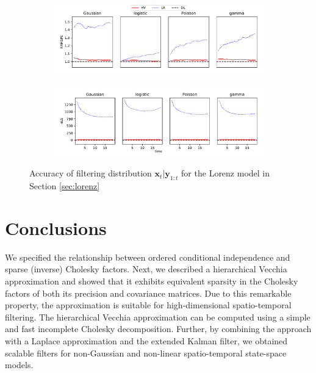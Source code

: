\documentclass[12pt,letterpaper]{article}
\theoremstyle{propstyle}
\theoremstyle{propstyle}
\theoremstyle{propstyle}
\theoremstyle{propstyle}
\theoremstyle{propstyle}
\newcommand{\bx}{\mathbf{x}}
\newcommand{\by}{\mathbf{y}}
\begin{document}
\begin{figure}[ht]
    \centering
    \begin{subfigure}{1.0\textwidth}
        \includegraphics[trim=0mm 6mm 0mm 0mm, clip,width=1.0\textwidth]{plots/lorenz-RRMSPE.pdf}
    \end{subfigure}
    \begin{subfigure}{1.0\textwidth}
        \includegraphics[trim=0mm 0mm 0mm 12mm, clip,width=1.0\textwidth]{plots/lorenz-dLS.pdf}
    \end{subfigure}
    \caption{Accuracy of filtering distribution $\bx_t | \by_{1:t}$ for the Lorenz model in Section \ref{sec:lorenz}}
    \label{fig:lorenz-scores}
\end{figure}






\section{Conclusions\label{sec:conclusion}}

We specified the relationship between ordered conditional independence and sparse (inverse) Cholesky factors. Next, we described a hierarchical Vecchia approximation and showed that it exhibits equivalent sparsity in the Cholesky factors of both its precision and covariance matrices. Due to this remarkable property, the approximation is suitable for high-dimensional spatio-temporal filtering.
The hierarchical Vecchia approximation can be computed using a simple and fast incomplete Cholesky decomposition. Further, by combining the approach with a Laplace approximation and the extended Kalman filter, we obtained scalable filters for non-Gaussian and non-linear spatio-temporal state-space models.
\end{document}
